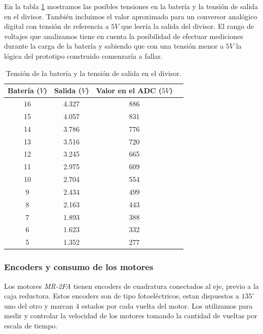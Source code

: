 	En la tabla \ref{HTdivT} mostramos las posibles tensiones en la bater\'ia y la tensi\'on de salida en el divisor. Tambi\'en incluimos el
	valor aproximado para un conversor anal\'ogico digital con tensi\'on de referencia a $5V$ que leer\'ia la salida del divisor. El rango de
	voltajes que analizamos tiene en cuenta la posibilidad de efectuar mediciones durante la carga de la bater\'ia y sabiendo que con una
	tensi\'on menor a $5 V$ la l\'ogica del prototipo construido comenzar\'ia a fallar.
	
	\begin{table}[ht]
		\begin{center}
			\begin{tabular}{|c|c|c|c|}
				\hline
				Bater\'ia ($V$) & Salida ($V$) & Valor en el ADC ($5V$) \\
				\hline
				16 & 4.327 & 886 \\
				15 & 4.057 & 831 \\
				14 & 3.786 & 776 \\
				13 & 3.516 & 720 \\
				12 & 3.245 & 665 \\
				11 & 2.975 & 609 \\
				10 & 2.704 & 554 \\
				9 & 2.434 & 499 \\
				8 & 2.163 & 443 \\
				7 & 1.893 & 388 \\
				6 & 1.623 & 332 \\
				5 & 1.352 & 277 \\
				\hline
			\end{tabular}
		\end{center}
		\caption{Tensi\'on de la bater\'ia y la tensi\'on de salida en el divisor.}
		\label{HTdivT}
	\end{table}

\subsubsection{Encoders y consumo de los motores}
\label{HSencodersConsumo}

	Los motores \emph{MR-2FA} tienen encoders de cuadratura conectados al eje, previo a la caja reductora. Estos encoders son
	de tipo fotoel\'ectricos, estan dispuestos a $135^{\circ}$ uno del otro y marcan $4$ estados por cada vuelta del motor.
	Los utilizamos para medir y controlar la velocidad de los motores tomando la cantidad de vueltas por escala de tiempo.
	
